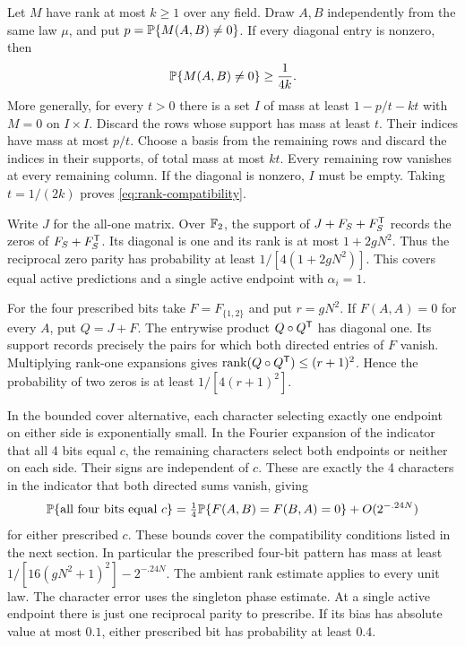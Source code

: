 Let \(M\) have rank at most \(k\ge1\) over any field. Draw \(A,B\)
independently from the same law \(\mu\), and put \(p=\mathbb P\{M(A,B)\ne0\}\).
If every diagonal entry is nonzero, then
\begin{equation}\label{eq:rank-compatibility}
 \mathbb P\{M(A,B)\ne0\}\ge\frac{1}{4k}.
\end{equation}
More generally, for every \(t>0\) there is a set \(I\) of mass at least
\(1-p/t-kt\) with \(M=0\) on \(I\times I\). Discard the rows whose
support has mass at least \(t\). Their indices have mass at most \(p/t\).
Choose a basis from the remaining rows and discard the indices in their
supports, of total mass at most \(kt\). Every remaining row vanishes at
every remaining column. If the diagonal is nonzero, \(I\) must be empty.
Taking \(t=1/(2k)\) proves \eqref{eq:rank-compatibility}.

Write \(J\) for the all-one matrix. Over \(\mathbb F_2\), the support of
\(J+F_S+F_S^{\mathsf T}\) records the zeros of \(F_S+F_S^{\mathsf T}\). Its diagonal
is one and its rank is at most \(1+2gN^2\). Thus the reciprocal zero
parity has probability at least \(1/[4(1+2gN^2)]\). This covers equal
active predictions and a single active endpoint with \(\alpha_i=1\).

For the four prescribed bits take \(F=F_{\{1,2\}}\) and put \(r=gN^2\).
If \(F(A,A)=0\) for every \(A\), put \(Q=J+F\). The entrywise product
\(Q\circ Q^{\mathsf T}\) has diagonal one. Its support records precisely the
pairs for which both directed entries of \(F\) vanish. Multiplying
rank-one expansions gives \(\operatorname{rank}(Q\circ Q^{\mathsf T})\le(r+1)^2\).
Hence the probability of two zeros is at least \(1/[4(r+1)^2]\).

In the bounded cover alternative, each character selecting exactly
one endpoint on either side is exponentially small. In the Fourier
expansion of the indicator that all 4 bits equal \(c\), the remaining
characters select both endpoints or neither on each side. Their signs
are independent of \(c\). These are exactly the 4 characters in the
indicator that both directed sums vanish, giving
\[
 \mathbb P\{\text{all four bits equal }c\}
 =\tfrac14\mathbb P\{F(A,B)=F(B,A)=0\}+O(2^{-.24N})
\]
for either prescribed \(c\). These bounds cover the compatibility
conditions listed in the next section. In particular the prescribed
four-bit pattern has mass at least \(1/[16(gN^2+1)^2]-2^{-.24N}\).
The ambient rank estimate applies to every unit law. The character error
uses the singleton phase estimate. At a single active endpoint there is just one reciprocal parity
to prescribe. If its bias has
absolute value at most \(0.1\), either prescribed bit has probability
at least \(0.4\).

